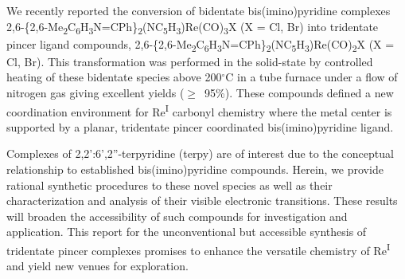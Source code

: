 We recently reported the conversion of bidentate bis(imino)pyridine complexes 2,6-\{2,6-Me\textsubscript{2}C\textsubscript{6}H\textsubscript{3}N=CPh\}\textsubscript{2}(NC\textsubscript{5}H\textsubscript{3})Re(CO)\textsubscript{3}X  (X = Cl, Br) into tridentate pincer ligand compounds, 2,6-\{2,6-Me\textsubscript{2}C\textsubscript{6}H\textsubscript{3}N=CPh\}\textsubscript{2}(NC\textsubscript{5}H\textsubscript{3})Re(CO)\textsubscript{2}X (X = Cl, Br)\autocite{jurca2013}. This transformation was performed in the solid-state by controlled heating of these bidentate species above 200$^\circ$C in a tube furnace under a flow of nitrogen gas giving excellent yields ($\geq$~95\%). These compounds defined a new coordination environment for Re\textsuperscript{I} carbonyl chemistry where the metal center is supported by a planar, tridentate pincer coordinated bis(imino)pyridine ligand. 

Complexes of 2,2':6',2''-terpyridine (terpy) are of interest due to the conceptual relationship to established bis(imino)pyridine compounds\autocite{russell2010, tondreau2012}. Herein, we provide rational synthetic procedures to these novel species as well as their characterization and analysis of their visible electronic transitions. These results will broaden the accessibility of such compounds for investigation and application. This report for the unconventional but accessible synthesis of tridentate pincer complexes promises to enhance the versatile chemistry of Re\textsuperscript{I} and yield new venues for exploration.
